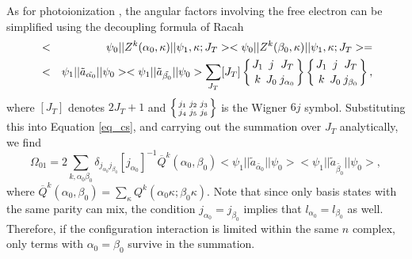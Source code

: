 \documentclass{elsart}
\newcommand{\sixj}[6]{\ensuremath{\left\{{#1\atop #4}{#2\atop #5}
{#3\atop #6}\right\}}}
\begin{document}
As for photoionization \citep{gu01b}, the angular factors involving the free
electron can be simplified using the decoupling formula of Racah
\begin{eqnarray}
&<&\psi_0||Z^k(\alpha_0, \kappa)||\psi_1,\kappa;J_T>
<\psi_0||Z^k(\beta_0, \kappa)||\psi_1,\kappa;J_T> = \nonumber\\
&<&\psi_1||\tilde{a}_{\tilde{\alpha_0}}||\psi_0>
<\psi_1||\tilde{a}_{\tilde{\beta_0}}||\psi_0>
\sum_{J_T}[J_T]\sixj{J_1}{j}{J_T}{k}{J_0}{j_{\alpha_0}}
\sixj{J_1}{j}{J_T}{k}{J_0}{j_{\beta_0}},
\end{eqnarray}
where $[J_T]$ denotes $2J_T+1$ and $\sixj{j_1}{j_2}{j_3}{j_4}{j_5}{j_6}$ is
the Wigner $6j$ symbol. 
Substituting this into Equation \ref{eq_cs}, and carrying
out the summation over $J_T$ analytically, we find
\begin{equation}
\Omega_{01} = 2\sum_{k,\alpha_0\beta_0}
\delta_{j_{\alpha_0}j_{\beta_0}}[j_{\alpha_0}]^{-1} 
\overline{Q}^k(\alpha_0,\beta_0)
<\psi_1||\tilde{a}_{\tilde{\alpha_0}}||\psi_0>
<\psi_1||\tilde{a}_{\tilde{\beta_0}}||\psi_0>,
\end{equation}
where $\overline{Q}^k(\alpha_0,\beta_0) = \sum_\kappa
Q^k(\alpha_0\kappa;\beta_0\kappa)$.
Note that since only basis states with the same parity can mix, the condition
$j_{\alpha_0}=j_{\beta_0}$ implies that $l_{\alpha_0} = l_{\beta_0}$ as
well. Therefore, if the configuration interaction is limited within the same
$n$ complex, only terms with $\alpha_0 = \beta_0$ survive in the summation. 
\end{document}
